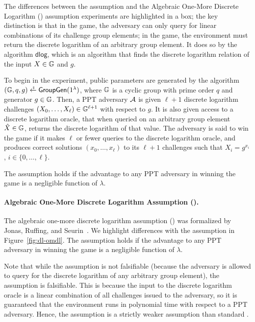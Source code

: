 The differences between the \OMDL assumption  and the Algebraic One-More Discrete Logarithm (\AOMDL) assumption experiments are highlighted in a box;
the key distinction is that in the \AOMDL game,
the adversary can only query for linear combinations of its challenge group elements;
in the \OMDL game, the environment must return the discrete logarithm of an arbitrary group element.
It does so by the algorithm $\mathsf{dlog}$,
which is an algorithm that finds the discrete logarithm relation of the input $X \in \mathbb{G} $ and $g$.

To begin in the \OMDL experiment,
public parameters are generated by the algorithm $ (\Gr, q , g) \randpick \GroupGen(1^\usecp) $,
where $\mathbb{G}$ is a cyclic group with prime order $q$ and generator $g \in \mathbb{G}$.
Then, a PPT adversary $\mathcal{A}$ is given $\ell+1$ discrete logarithm challenges $(X_0, \ldots, X_\ell) \in \mathbb{G}^{\ell+1}$
with respect to $g$.
It is also given access to a discrete logarithm oracle,
that when queried on an arbitrary group element $\hat{X} \in \mathbb{G}$,
returns the discrete logarithm of that value.
The adversary is said to win the \OMDL game if it makes $\ell$ or fewer queries
to the discrete logarithm oracle,
and produces correct solutions $(x_0, \ldots, x_\ell)$ to its $\ell+1$ challenges such that $X_i = g^{x_i}$,
$i \in \{ 0, \ldots, \ell\}$.

The \OMDL assumption holds if the advantage to any PPT adversary in winning the
\OMDL game is a negligible function of $\lambda$.

\paragraph{Algebraic One-More Discrete Logarithm Assumption (\AOMDL).}
The algebraic one-more discrete logarithm assumption (\AOMDL) was formalized by Jonas, Ruffing, and Seurin~\cite{NickRS21}.
We highlight differences with the \OMDL assumption in Figure~\ref{fig:dl-omdl}.
The \AOMDL assumption holds if the advantage to any PPT adversary in winning the
\AOMDL game is a negligible function of $\lambda$.

Note that while the \OMDL assumption is not falsifiable
(because the adversary is allowed to query for the discrete logarithm of any arbitrary group element),
the \AOMDL assumption is falsifiable.
This is because the input to the discrete logarithm oracle is a linear combination of all challenges issued to the adversary,
so it is guaranteed that the environment runs in polynomial time with respect to a PPT adversary.
Hence, the \AOMDL assumption is a strictly weaker assumption than standard \OMDL.

